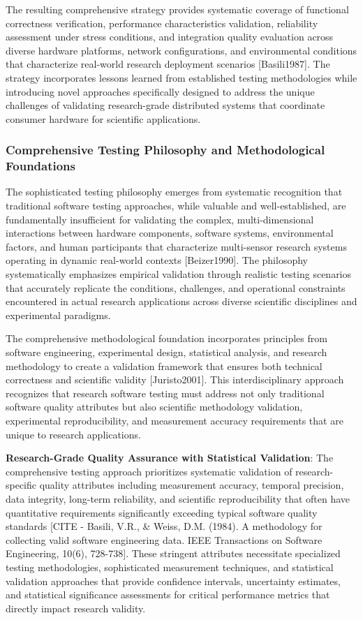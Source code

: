 \documentclass[12pt,a4paper]{article}
\begin{document}
The resulting comprehensive strategy provides systematic coverage of functional correctness verification, performance
characteristics validation, reliability assessment under stress conditions, and integration quality evaluation across
diverse hardware platforms, network configurations, and environmental conditions that characterize real-world research
deployment scenarios [Basili1987]. The strategy incorporates lessons learned from established testing methodologies
while introducing novel approaches specifically designed to address the unique challenges of validating research-grade
distributed systems that coordinate consumer hardware for scientific applications.

\subsubsection{Comprehensive Testing Philosophy and Methodological Foundations}

The sophisticated testing philosophy emerges from systematic recognition that traditional software testing approaches,
while valuable and well-established, are fundamentally insufficient for validating the complex, multi-dimensional
interactions between hardware components, software systems, environmental factors, and human participants that
characterize multi-sensor research systems operating in dynamic real-world contexts [Beizer1990]. The philosophy
systematically emphasizes empirical validation through realistic testing scenarios that accurately replicate the
conditions, challenges, and operational constraints encountered in actual research applications across diverse
scientific disciplines and experimental paradigms.

The comprehensive methodological foundation incorporates principles from software engineering, experimental design,
statistical analysis, and research methodology to create a validation framework that ensures both technical correctness
and scientific validity [Juristo2001]. This interdisciplinary approach recognizes that research software testing must
address not only traditional software quality attributes but also scientific methodology validation, experimental
reproducibility, and measurement accuracy requirements that are unique to research applications.

\textbf{Research-Grade Quality Assurance with Statistical Validation}: The comprehensive testing approach prioritizes
systematic validation of research-specific quality attributes including measurement accuracy, temporal precision, data
integrity, long-term reliability, and scientific reproducibility that often have quantitative requirements significantly
exceeding typical software quality
standards [CITE - Basili, V.R., \& Weiss, D.M. (1984). A methodology for collecting valid software engineering data. IEEE Transactions on Software Engineering, 10(6), 728-738].
These stringent attributes necessitate specialized testing methodologies, sophisticated measurement techniques, and
statistical validation approaches that provide confidence intervals, uncertainty estimates, and statistical significance
assessments for critical performance metrics that directly impact research validity.
\end{document}

